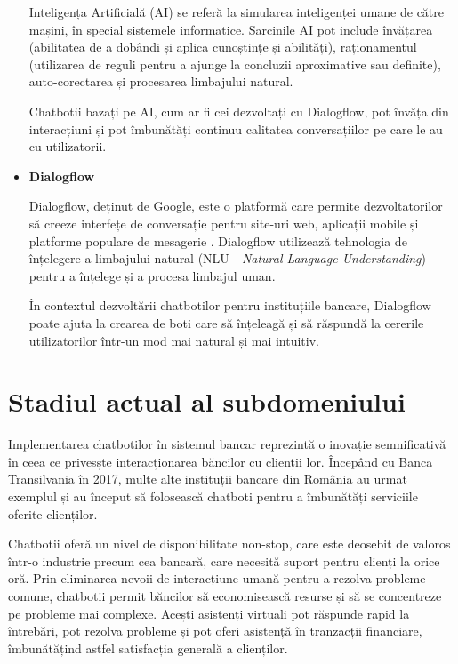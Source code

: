 \begin{itemize}
Inteligența Artificială (AI) se referă la simularea inteligenței umane de către mașini, în special sistemele informatice. Sarcinile AI pot include învățarea (abilitatea de a dobândi și aplica cunoștințe și abilități), raționamentul (utilizarea de reguli pentru a ajunge la concluzii aproximative sau definite), auto-corectarea și procesarea limbajului natural.

Chatbotii bazați pe AI, cum ar fi cei dezvoltați cu Dialogflow, pot învăța din interacțiuni și pot îmbunătăți continuu calitatea conversațiilor pe care le au cu utilizatorii.

    \item \textbf{Dialogflow}

Dialogflow, deținut de Google, este o platformă care permite dezvoltatorilor să creeze interfețe de conversație pentru site-uri web, aplicații mobile și platforme populare de mesagerie \cite{sharma2018}. Dialogflow utilizează tehnologia de înțelegere a limbajului natural (NLU - \emph{Natural Language Understanding}) pentru a înțelege și a procesa limbajul uman.

În contextul dezvoltării chatbotilor pentru instituțiile bancare, Dialogflow poate ajuta la crearea de boti care să înțeleagă și să răspundă la cererile utilizatorilor într-un mod mai natural și mai intuitiv.

\end{itemize}

\section{Stadiul actual al subdomeniului}

Implementarea chatbotilor în sistemul bancar reprezintă o inovație semnificativă în ceea ce privesște interacționarea băncilor cu clienții lor. Începând cu Banca Transilvania în 2017, multe alte instituții bancare din România au urmat exemplul și au început să folosească chatboti pentru a îmbunătăți serviciile oferite clienților.

Chatbotii oferă un nivel de disponibilitate non-stop, care este deosebit de valoros într-o industrie precum cea bancară, care necesită suport pentru clienți la orice oră. Prin eliminarea nevoii de interacțiune umană pentru a rezolva probleme comune, chatbotii permit băncilor să economisească resurse și să se concentreze pe probleme mai complexe. Acești asistenți virtuali pot răspunde rapid la întrebări, pot rezolva probleme și pot oferi asistență în tranzacții financiare, îmbunătățind astfel satisfacția generală a clienților.

